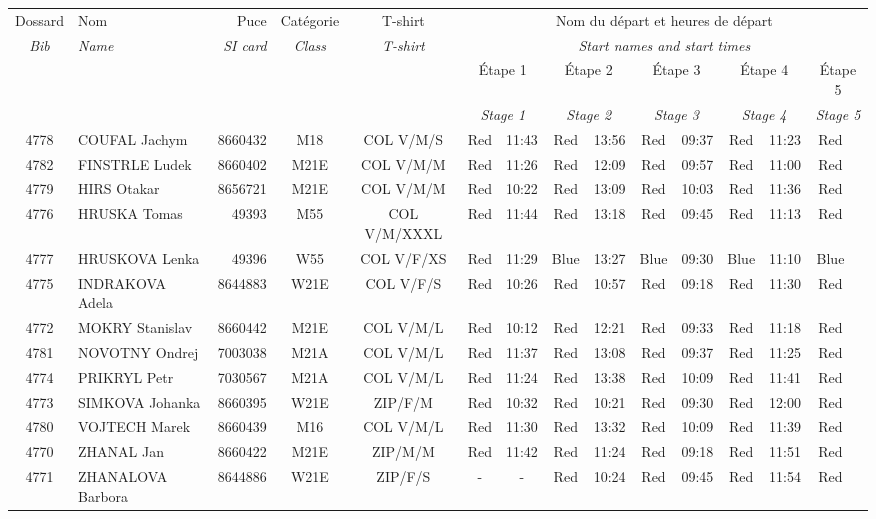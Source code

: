 \documentclass{report}
\begin{document}
  \begin{longtable}{|c|l|r|c|c|*{5}{cc|}}
    Dossard & Nom  & Puce    & Catégorie & T-shirt & \multicolumn{10}{c|}{Nom du départ et heures de départ} \\
    \itshape Bib     & \itshape Name & \itshape SI card & \itshape Class  & \itshape  T-shirt  & \multicolumn{10}{c|}{\itshape Start names and start times} \\
    \hline
    & & & & & \multicolumn{2}{c|}{Étape 1} & \multicolumn{2}{c|}{Étape 2} & \multicolumn{2}{c|}{Étape 3} & \multicolumn{2}{c|}{Étape 4} & \multicolumn{2}{c|}{Étape 5} \\
    & & & & & \multicolumn{2}{c|}{\itshape Stage 1} & \multicolumn{2}{c|}{\itshape Stage 2} & \multicolumn{2}{c|}{\itshape Stage 3} & \multicolumn{2}{c|}{\itshape Stage 4} & \multicolumn{2}{c|}{\itshape Stage 5} \\
    \hline
    4778 & COUFAL Jachym & 8660432 & M18 & COL V/M/S & Red & 11:43 & Red & 13:56 & Red & 09:37 & Red & 11:23 & Red &  \\
    4782 & FINSTRLE Ludek & 8660402 & M21E & COL V/M/M & Red & 11:26 & Red & 12:09 & Red & 09:57 & Red & 11:00 & Red &  \\
    4779 & HIRS Otakar & 8656721 & M21E & COL V/M/M & Red & 10:22 & Red & 13:09 & Red & 10:03 & Red & 11:36 & Red &  \\
    4776 & HRUSKA Tomas & 49393 & M55 & COL V/M/XXXL & Red & 11:44 & Red & 13:18 & Red & 09:45 & Red & 11:13 & Red &  \\
    4777 & HRUSKOVA Lenka & 49396 & W55 & COL V/F/XS & Red & 11:29 & Blue & 13:27 & Blue & 09:30 & Blue & 11:10 & Blue &  \\
    4775 & INDRAKOVA Adela & 8644883 & W21E & COL V/F/S & Red & 10:26 & Red & 10:57 & Red & 09:18 & Red & 11:30 & Red &  \\
    4772 & MOKRY Stanislav & 8660442 & M21E & COL V/M/L & Red & 10:12 & Red & 12:21 & Red & 09:33 & Red & 11:18 & Red &  \\
    4781 & NOVOTNY Ondrej & 7003038 & M21A & COL V/M/L & Red & 11:37 & Red & 13:08 & Red & 09:37 & Red & 11:25 & Red &  \\
    4774 & PRIKRYL Petr & 7030567 & M21A & COL V/M/L & Red & 11:24 & Red & 13:38 & Red & 10:09 & Red & 11:41 & Red &  \\
    4773 & SIMKOVA Johanka & 8660395 & W21E & ZIP/F/M & Red & 10:32 & Red & 10:21 & Red & 09:30 & Red & 12:00 & Red &  \\
    4780 & VOJTECH Marek & 8660439 & M16 & COL V/M/L & Red & 11:30 & Red & 13:32 & Red & 10:09 & Red & 11:39 & Red &  \\
    4770 & ZHANAL Jan & 8660422 & M21E & ZIP/M/M & Red & 11:42 & Red & 11:24 & Red & 09:18 & Red & 11:51 & Red &  \\
    4771 & ZHANALOVA Barbora & 8644886 & W21E & ZIP/F/S & - &  - & Red & 10:24 & Red & 09:45 & Red & 11:54 & Red &  \\
  \end{longtable}
\end{document}
